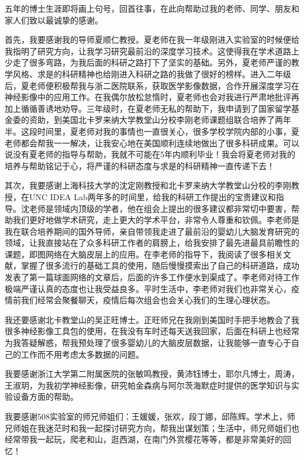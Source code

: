 \cleardoublepage
{}
五年的博士生涯即将画上句号，回首往事，在此向帮助过我的老师、同学、朋友和家人们致以最诚挚的感谢。

首先，我要感谢我的导师夏顺仁教授。夏老师在我一年级刚进入实验室的时候便给我指明了研究方向，让我学习研究最前沿的深度学习技术。这使得我在学术道路上少走了很多弯路，为我后面的科研之路打下了坚实的基础。另外，夏老师严谨的教学风格、求是的科研精神也给刚进入科研之路的我做了很好的榜样。进入二年级后，夏老师便积极帮我与浙二医院联系，获取医学影像数据，合作开展深度学习在神经影像中的应用工作。在我偶尔放松怠惰时，夏老师也会对我进行严肃地批评再加上循循善诱地劝导。三年级时，在夏老师无私的帮助下，我申请到了国家留学基金委的资助，到美国北卡罗来纳大学教堂山分校李刚老师课题组联合培养了两年半。这段时间里，夏老师对我的事情也一直很关心，很多学校学院内部的小事，夏老师都会帮我一一解决，让我安心地在美国顺利连续地做出了很多科研成果。可以说没有夏老师的指导与帮助，我就不可能在5年内顺利毕业！我会将夏老师对我的培养与帮助铭记于心，将严谨的科研态度与求是的科研精神一直传递下去！

其次，我要感谢上海科技大学的沈定刚教授和北卡罗来纳大学教堂山分校的李刚教授，在UNC IDEA Lab两年多的时间里，给我的科研工作提出的宝贵建议和指导。沈老师是领域内顶级的学者，他在组会上提出的很多建议都非常切中要害，帮助我们更好地做学术研究，走上更大的学术平台，非常令人尊重和钦佩。李老师是我在联合培养期间的国外导师，亲自带领我走进了最前沿的婴幼儿大脑发育研究的领域，让我直接站在了众多科研工作者的肩膀上，给我安排了最先进最具前瞻性的课题，即图网络在大脑皮层上的应用。在李老师的指导下，我阅读了很多相关文献，掌握了很多流行的基础工具的使用，随后慢慢摸索出了自己的科研道路，成功发表了第一篇球面网络的文章后，后面的许多工作便水到渠成了。李老师对待工作极端严谨认真的态度也让我受益良多。平时生活中，李老师对我们也非常关心，疫情前我们经常会聚餐聊天，疫情后每次组会也会关心我们的生理心理状态。

我还要感谢北卡教堂山的吴正旺博士。正旺师兄在我刚到美国时手把手地教会了我很多神经影像工具包的使用，在我没有车时还每天送我回家，后面在科研上也经常为我答疑解惑，帮我预处理了很多婴幼儿的大脑皮层数据，让我能够一直专心于自己的工作而不用考虑太多数据的问题。

我要感谢浙江大学第二附属医院的张敏鸣教授，黄沛钰博士，耶尔凡博士，周涛，王淑玥，为我初学神经影像，研究帕金森病与阿尔茨海默症时提供的医学知识与实验设备方面的帮助。

我要感谢508实验室的师兄师姐们：王媛媛，张欢，段丁娜，邱陈辉。学术上，师兄师姐在我迷茫时和我一起探讨研究方向，帮我出谋划策；生活中，师兄师姐们也经常带我一起玩，爬老和山，逛西湖，在南门外赏樱花等等，都是非常美好的回忆！

